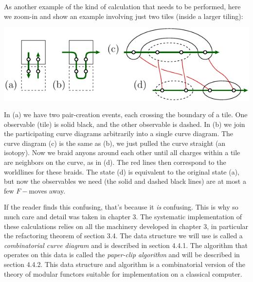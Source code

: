 
As another example of the kind of calculation that needs to be performed,
here we zoom-in and show an example involving just two tiles (inside a larger tiling):
\begin{center}
\includegraphics[width=0.8\columnwidth]{pic-syndrome.pdf}
\end{center}
In (a) we have two pair-creation events, each crossing the boundary of a tile. 
One observable (tile) is solid black, and the other observable is dashed.
In (b) we join the participating curve 
diagrams arbitrarily into a single curve diagram.
The curve diagram (c) is the same as (b), we just
pulled the curve straight (an isotopy).
Now we braid anyons around each other until all charges within 
a tile are neighbors on the curve, as in (d).  
The red lines then correspond to the worldlines for these braids.
The state (d) is equivalent to the original
state (a), but now the observables we need (the solid and dashed
black lines) are at most a few $F-$moves away.

If the reader finds this confusing, that's because it \emph{is}
confusing. This is why so much care and detail was taken in chapter 3.
The systematic implementation of these calculations relies on all the
machinery developed in chapter 3, in particular the refactoring theorem of
section 3.4.
The data structure we will use is called a \emph{combinatorial curve diagram}
and is described in section 4.4.1.
The algorithm that operates on this data is called the 
\emph{paper-clip algorithm} and will be described in section 4.4.2.
This data structure and algorithm is a combinatorial version of the theory
of modular functors suitable for implementation on a classical computer.

